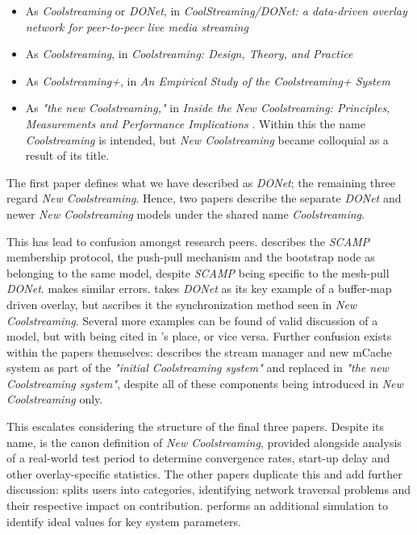 \documentclass[12pt,a4paper]{article}
\begin{document}
\begin{itemize}
	\item As \textit{Coolstreaming} or \textit{DONet}, in \textit{CoolStreaming/DONet: a data-driven overlay network for peer-to-peer live media streaming} \cite{Zhang2005}
	\item As \textit{Coolstreaming}, in \textit{Coolstreaming: Design, Theory, and Practice} \cite{Xie2007}
	\item As \textit{Coolstreaming+}, in \textit{An Empirical Study of the Coolstreaming+ System} \cite{Li2007}
	\item As \textit{"the new Coolstreaming,"} in \textit{Inside the New Coolstreaming: Principles, Measurements and Performance Implications} \cite{Li2008}. Within this the name \textit{Coolstreaming} is intended, but \textit{New Coolstreaming} became colloquial as a result of its title. 
\end{itemize}

The first paper defines what we have described as \textit{DONet}; the remaining three regard \textit{New Coolstreaming}. Hence, two papers describe the separate \textit{DONet} and newer \textit{New Coolstreaming} models under the shared name \textit{Coolstreaming}.

This has lead to confusion amongst research peers. \cite{Kondo2014} describes the \textit{SCAMP} membership protocol, the push-pull mechanism and the bootstrap node as belonging to the same model, despite \textit{SCAMP} being specific to the mesh-pull \textit{DONet}. \cite{Beraldi2010} makes similar errors. \cite{Lan2011} takes \textit{DONet} as its key example of a buffer-map driven overlay, but ascribes it the synchronization method seen in \textit{New Coolstreaming}. Several more examples can be found of valid discussion of a model, but with \cite{Xie2007} being cited in \cite{Zhang2005}'s place, or vice versa. Further confusion exists within the papers themselves:  \cite{Li2008} describes the stream manager and new mCache system as part of the \textit{"initial Coolstreaming system"} and replaced in \textit{"the new Coolstreaming system"}, despite all of these components being introduced in \textit{New Coolstreaming} only.

This escalates considering the structure of the final three papers. Despite its name, \cite{Xie2007} is the canon definition of \textit{New Coolstreaming}, provided alongside analysis of a real-world test period to determine convergence rates, start-up delay and other overlay-specific statistics. The other papers duplicate this and add further discussion: \cite{Li2007} splits users into categories, identifying network traversal problems and their respective impact on contribution. \cite{Li2008} performs an additional simulation to identify ideal values for key system parameters.
\end{document}
